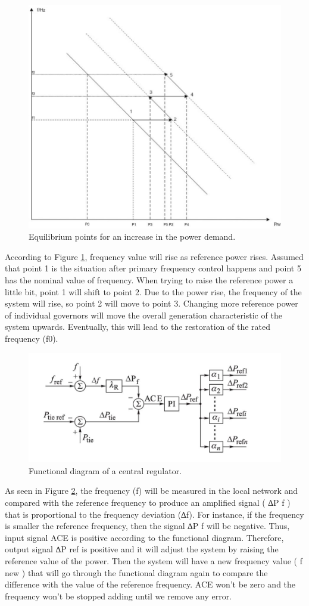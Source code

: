 \documentclass{report}
\begin{document}
\begin{figure}[htb]
\centering
\includegraphics[width = .5\textwidth]{Figure/theory_sfc.png}
\caption{Equilibrium points for an increase in the power demand.}
\label{theory_sfc}
\end{figure}

According to Figure \ref{theory_sfc}, frequency value will rise as reference power rises. Assumed that point 1 is the situation after primary frequency control happens and point 5 has the nominal value of frequency. When trying to raise the reference power a little bit, point 1 will shift to point 2. Due to the power rise, the frequency of the system will rise, so point 2 will move to point 3. Changing more reference power of individual governors will move the overall generation characteristic of the system upwards. Eventually, this will lead to the restoration of the rated frequency (f0).\\

\begin{figure}[htb]
\centering
\includegraphics[width = .618\textwidth]{Figure/agc_blockDiagram.png}
\caption{Functional diagram of a central regulator.}
\label{agc_blockDiagram}
\end{figure}

As seen in Figure \ref{agc_blockDiagram}, the frequency (f) will be measured in the local network and compared with the reference frequency to produce an amplified signal ( ∆P f ) that is proportional to the frequency deviation (∆f). For instance, if the frequency is smaller the reference frequency, then the signal ∆P f will be negative. Thus, input signal ACE is positive according to the functional diagram. Therefore, output signal ∆P ref is positive and it will adjust the system by raising the reference value of the power. Then the system will have a new frequency value ( f new ) that will go through the functional diagram again to compare the difference with the value of the reference frequency. ACE won’t be zero and the frequency won’t be stopped adding until we remove any error.\\
\end{document}
